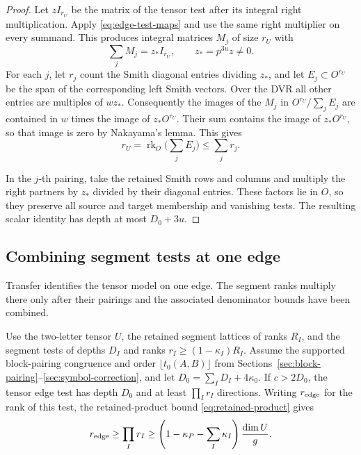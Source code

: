 \begin{proof}
Let \(zI_{r_U}\) be the matrix of the tensor test after its
integral right multiplication. Apply \eqref{eq:edge-test-maps}
and use the same right multiplier on every summand. This produces
integral matrices \(M_j\) of size \(r_U\) with
\[
                    \sum_j M_j=z_*I_{r_U},
             \qquad z_*=p^{3u}z\ne0 .
\]
For each \(j\), let \(r_j\) count the Smith diagonal entries
dividing \(z_*\), and let \(E_j\subset O^{r_U}\) be the span
of the corresponding left Smith vectors. Over the DVR all
other entries are multiples of \(wz_*\). Consequently the images
of the \(M_j\) in \(O^{r_U}/\sum_j E_j\) are contained in
\(w\) times the image of \(z_*O^{r_U}\). Their sum contains
the image of \(z_*O^{r_U}\), so that image is zero by Nakayama's
lemma. This gives
\[
  r_U=\operatorname{rk}_O\bigl(\textstyle\sum_j E_j\bigr)
                                       \le\textstyle\sum_j r_j .
\]

In the \(j\)-th pairing, take the retained Smith rows and columns
and multiply the right partners by \(z_*\) divided by their
diagonal entries. These factors lie in \(O\), so they preserve
all source and target membership and vanishing tests. The
resulting scalar identity has depth at most \(D_0+3u\).

\end{proof}

\subsection{Combining segment tests at one edge}

Transfer identifies the tensor model on one edge. The segment ranks multiply there only after their pairings and the associated denominator bounds have been combined.

\begin{proposition}\label{prop:segment-edge-assembly}
Use the two-letter tensor \(U\), the retained segment lattices
of ranks \(R_I\), and the segment tests of depths \(D_I\) and
ranks \(r_I\ge(1-\kappa_I)R_I\). Assume the supported
block-pairing congruence and order \(\lfloor t_0(A,B)\rfloor\)
from Sections~\ref{sec:block-pairing}--\ref{sec:symbol-correction},
and let \(D_0=\sum_I D_I+4\kappa_0\). If \(c>2D_0\), the
tensor edge test has depth \(D_0\) and at least \(\prod_I r_I\)
directions. Writing \(r_{\rm edge}\) for the rank of this test, the retained-product bound \eqref{eq:retained-product} gives
\[
 r_{\rm edge}\ge\prod_I r_I\ge\left(1-\kappa_P-\sum_I\kappa_I\right)\frac{\dim U}{g}.
\]

\end{proposition}

